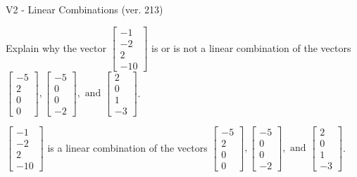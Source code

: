 \begin{exercise}
  \begin{exerciseTitle}V2 - Linear Combinations (ver. 213)\end{exerciseTitle}
  \begin{exerciseStatement}
    Explain why the vector \(\left[\begin{array}{c}
-1 \\
-2 \\
2 \\
-10
\end{array}\right]\)  is or is not a linear 
	combination of the vectors \(\left[\begin{array}{c}
-5 \\
2 \\
0 \\
0
\end{array}\right] , \left[\begin{array}{c}
-5 \\
0 \\
0 \\
-2
\end{array}\right] , \text{ and } \left[\begin{array}{c}
2 \\
0 \\
1 \\
-3
\end{array}\right]\).
	


  \end{exerciseStatement}
  \begin{exerciseAnswer}
   \(\left[\begin{array}{c}
-1 \\
-2 \\
2 \\
-10
\end{array}\right]\) 
  	 is  
	a linear combination of the vectors \(\left[\begin{array}{c}
-5 \\
2 \\
0 \\
0
\end{array}\right] , \left[\begin{array}{c}
-5 \\
0 \\
0 \\
-2
\end{array}\right] , \text{ and } \left[\begin{array}{c}
2 \\
0 \\
1 \\
-3
\end{array}\right]\).

	
  


  \end{exerciseAnswer}
\end{exercise}